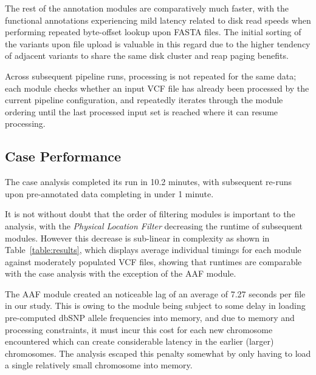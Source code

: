 \documentclass[twocolumn]{bmcart}%
\begin{document}
The rest of the annotation modules are comparatively much faster, with the functional annotations experiencing mild latency related to disk read speeds when performing repeated byte-offset lookup upon FASTA files. The initial sorting of the variants upon file upload is valuable in this regard due to the higher tendency of adjacent variants to share the same disk cluster and reap paging benefits.

Across subsequent pipeline runs, processing is not repeated for the same data; each module checks whether an input VCF file has already been processed by the current pipeline configuration, and repeatedly iterates through the module ordering until the last processed input set is reached where it can resume processing.

\subsection{Case Performance}

The case analysis completed its run in 10.2 minutes, with subsequent re-runs upon pre-annotated data completing in under 1 minute. 

It is not without doubt that the order of filtering modules is important to the analysis, with the \textit{Physical Location Filter} decreasing the runtime of subsequent modules. However this decrease is sub-linear in complexity as shown in Table~\ref{table:results}, which displays average individual timings for each module against moderately populated VCF files, showing that runtimes are comparable with the case analysis with the exception of the AAF module.

The AAF module created an noticeable lag of an average of 7.27 seconds per file in our study. This is owing to the module being subject to some delay in loading pre-computed dbSNP allele frequencies into memory, and due to memory and processing constraints, it must incur this cost for each new chromosome encountered which can create considerable latency in the earlier (larger) chromosomes. The analysis escaped this penalty somewhat by only having to load a single relatively small chromosome into memory.


\end{document}
